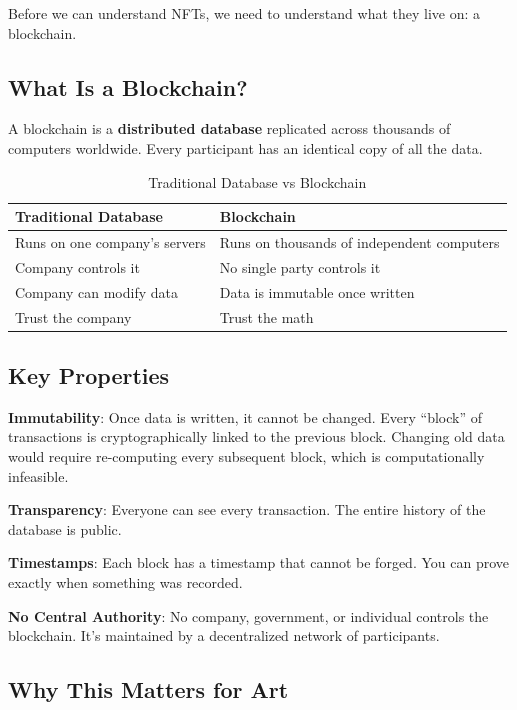 \documentclass[11pt,a4paper]{article}
\newcommand{\keyword}[1]{\textbf{\textcolor{accentcolor}{#1}}}
\begin{document}
Before we can understand NFTs, we need to understand what they live on: a blockchain.

\subsection{What Is a Blockchain?}

A blockchain is a \keyword{distributed database} replicated across thousands of computers worldwide. Every participant has an identical copy of all the data.

\begin{table}[h]
\centering
\begin{tabular}{@{}L{6cm}L{6cm}@{}}
\toprule
\textbf{Traditional Database} & \textbf{Blockchain} \\
\midrule
Runs on one company's servers & Runs on thousands of independent computers \\
Company controls it & No single party controls it \\
Company can modify data & Data is immutable once written \\
Trust the company & Trust the math \\
\bottomrule
\end{tabular}
\caption{Traditional Database vs Blockchain}
\end{table}

\subsection{Key Properties}

\textbf{Immutability}: Once data is written, it cannot be changed. Every ``block'' of transactions is cryptographically linked to the previous block. Changing old data would require re-computing every subsequent block, which is computationally infeasible.

\textbf{Transparency}: Everyone can see every transaction. The entire history of the database is public.

\textbf{Timestamps}: Each block has a timestamp that cannot be forged. You can prove exactly when something was recorded.

\textbf{No Central Authority}: No company, government, or individual controls the blockchain. It's maintained by a decentralized network of participants.

\subsection{Why This Matters for Art}
\end{document}
